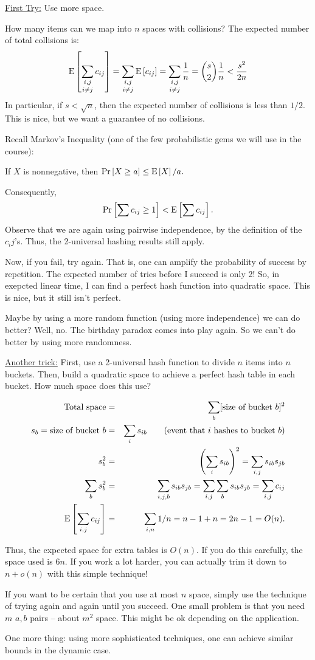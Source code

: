 \documentclass{article}
\renewcommand{\Pr}[1]{\textnormal{Pr}\left[ #1 \right]}
\newcommand{\E}[1]{\textnormal{E}\left[ #1 \right]}
\begin{document}
\underline{First Try:} Use more space.

How many items can we map into $n$ spaces with collisions?  The expected number of total collisions is:
$$\E{\mathop{\sum_{i,j}}_{i\not=j} c_{ij}} = \mathop{\sum_{i,j}}_{i\not=j}\E{c_{ij}} = \mathop{\sum_{i,j}}_{i\not=j} {1 \over n} = {s \choose 2}{1 \over n} < {s^2 \over 2n}$$
In particular, if $s < \sqrt{n}$, then the expected number of collisions is less than $1/2$. This is nice, but we want a guarantee of no collisions.

Recall Markov's Inequality (one of the few probabilistic gems we will use in the course):
\begin{lemma}
If $X$ is nonnegative, then
$\Pr{X \geq a} \leq \E{X}/a.$
\end{lemma}

Consequently, $$\Pr{\sum c_{ij} \geq 1} < \E{\sum c_{ij}}.$$
Observe that we are again using pairwise independence, by the definition of the $c_ij$'s.  Thus, the 2-universal hashing results still apply.

Now, if you fail, try again.  That is, one can amplify the probability of
success by repetition.  The expected number of tries before I succeed is
only 2!  So, in exepcted linear time, I can find a perfect hash function into
quadratic space.  This is nice, but it still isn't perfect.

Maybe by using a more random function (using more independence) we can do better?  Well, no.  The birthday paradox comes into play again.  So we can't do better by using more randomness.

\underline{Another trick:}  First, use a 2-universal hash function to divide $n$ items into $n$ buckets.  Then, build a quadratic space to achieve a perfect hash table in each bucket.  How much space does this use?

\begin{eqnarray*}
\hbox{Total space} & = & \sum_b [\hbox{size of bucket } b] ^2 \\
s_b = \hbox{size of bucket } b & = & \sum_i s_{ib} \qquad\hbox{(event that $i$ hashes to bucket $b$)} \\
s_b^2 & = & \left( \sum_i s_{ib}\right)^2= \sum_{i,j} s_{ib}s_{jb} \\
\sum_b s_b^2 & = & \sum_{i,j,b} s_{ib}s_{jb} = \sum_{i,j}\sum_b s_{ib}s_{jb} = \sum_{i,j} c_{ij} \\
\E{\sum_{i,j}c_{ij}} & = & \sum_{i,n}1/n = n - 1 + n = 2n - 1 = O(n).
\end{eqnarray*}

Thus, the expected space for extra tables is $O(n)$.  If you do this carefully, the space used is $6n$. If you work a lot harder, you can actually trim it down to $n + o(n)$ with this simple technique!

If you want to be certain that you use at most $n$ space, simply use the technique of trying again and again until you succeed.  One small problem is that you need $m$ $a,b$ pairs -- about $m^2$ space.  This might be ok depending on the application.

One more thing: using more sophisticated techniques, one can achieve similar bounds in the dynamic case.
\end{document}
